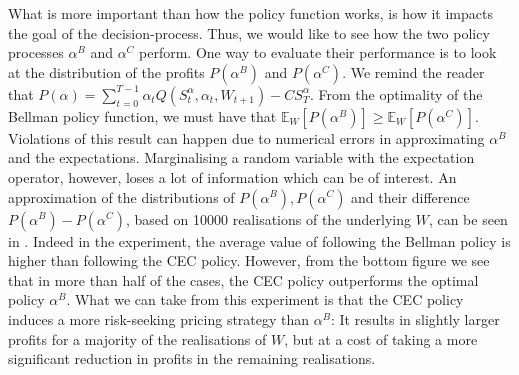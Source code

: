 \documentclass[main.tex]{subfiles}
\begin{document}
What is more important than how the policy function works, is how it
impacts the goal of the decision-process. Thus, we would like to see
how the two policy processes $\alpha^B$ and $\alpha^C$ perform.
One way to evaluate their performance is to look at
the distribution of the profits $P(\alpha^B)$ and $P(\alpha^C)$.
We remind the reader that
$P(\alpha) =
\sum_{t=0}^{T-1}\alpha_tQ(S_t^\alpha,\alpha_t,W_{t+1})-CS_T^\alpha$.
From the optimality of the Bellman policy function, we must have
that $\mathbb{E}_W[P(\alpha^B)]\geq \mathbb
E_W[P(\alpha^C)]$. Violations of this result can happen due to
numerical errors in approximating $\alpha^B$ and the expectations.
Marginalising a random variable with the expectation operator, however,
loses a lot of information which can be of interest.
An approximation of the distributions of $P(\alpha^B), P(\alpha^C)$
and their difference
$P(\alpha^B)-P(\alpha^C)$, based on \num{10000} realisations of the
underlying $W$, can be seen in .
Indeed in the experiment, the average value of following the
Bellman policy is higher than following the CEC policy.
However, from the bottom figure we see that
in more than half of the cases, the CEC policy outperforms the optimal
policy $\alpha^B$. What we can take from this experiment is that
the CEC policy induces a more risk-seeking pricing strategy than
$\alpha^B$: It results in slightly larger profits for a majority of the
realisations of $W$, but at a cost of taking a more significant
reduction in
profits in the remaining realisations.
\end{document}
